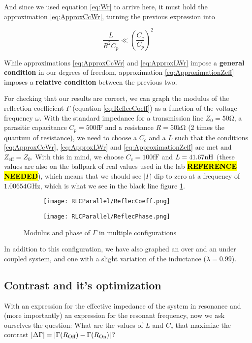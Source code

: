 \documentclass[../main.tex]{subfiles}
\begin{document}
And since we used equation \ref{eq:Wr} to arrive here, it must hold
the approximation \ref{eq:ApproxCcWr}, turning the previous expression into

\begin{equation}
\label{eq:ApproximationZeff}
    \frac{L}{R^2 C_{p}} \ll \left(\frac{C_{c}}{C_{p}}\right)^2
\end{equation}

While approximations \ref{eq:ApproxCcWr} and \ref{eq:ApproxLWr} impose a
\textbf{general condition} in our degrees of freedom, approximation
\ref{eq:ApproximationZeff} imposes a \textbf{relative condition} between
the previous two.

For checking that our results are correct, we can graph the modulus of the
reflection coefficient \(\Gamma\) (equation \ref{eq:ReflecCoeff}) as a function
of the voltage frequency \(\omega\). With the standard impedance for a
transmission line \(Z_{0} = 50 \unit{\ohm}\), a parasitic capacitance
\(C_{p} = 500 \unit{\fF}\) and a resistance \(R = 50\unit{\kohm}\)
(2 times the quantum of resistance), we need to choose a \(C_{c}\) and a \(L\)
such that the conditions \ref{eq:ApproxCcWr}, \ref{eq:ApproxLWr} and
\ref{eq:ApproximationZeff} are met and \(Z_{\text{eff}} = Z_{0}\). With this in
mind, we choose \(C_{c} = 100 \unit{\fF}\) and \(L = 41.67 \unit{\nH}\)
(these values are also on the ballpark of real values used in the lab 
\hl{\textbf{REFERENCE NEEDED}}), which means that we should see \(|\Gamma|\)
dip to zero at a frequency of \(1.00654 \unit{\giga\hertz}\), which is what we
see in the black line figure \ref{fig:ReflexCoeffAndPhase}.


\begin{figure}[t]
\centering
\begin{subfigure}[T]{.5\textwidth}
  \centering
  \texttt{[image: RLCParallel/ReflecCoeff.png]}
\end{subfigure}%
\begin{subfigure}[T]{.5\textwidth}
  \centering
  \texttt{[image: RLCParallel/ReflecPhase.png]}
\end{subfigure}
\caption{Modulus and phase of \(\Gamma\) in multiple configurations}
\label{fig:ReflexCoeffAndPhase}
\end{figure}

In addition to this configuration, we have also graphed an over and an
under coupled system, and one with a slight variation of the inductance
(\(\lambda = 0.99\)).


\subsection{Contrast and it's optimization}
With an expression for the effective impedance of the system in resonance and
(more importantly) an expression for the resonant frequency, now we ask
ourselves the question: What are the values of \(L\) and \(C_{c}\) that
maximize the contrast
\(|\Delta\Gamma| = |\Gamma(R_{\text{Off}}) - \Gamma(R_{\text{On}})|\)?
\end{document}
